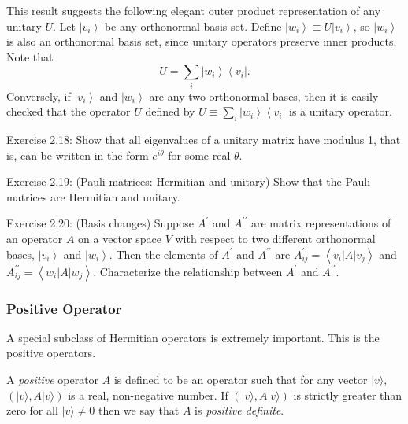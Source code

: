 This result suggests the following elegant outer product representation of any unitary $U$. Let $\left|v_{i}\right\rangle$ be any orthonormal basis set. Define $\left|w_{i}\right\rangle \equiv U\left|v_{i}\right\rangle$, so $\left|w_{i}\right\rangle$ is also an orthonormal basis set, since unitary operators preserve inner products. Note that
\begin{equation}
    U=\sum_{i}\left|w_{i}\right\rangle\left\langle v_{i}\right|.
\end{equation}
Conversely, if $\left|v_{i}\right\rangle$ and $\left|w_{i}\right\rangle$ are any two orthonormal bases, then it is easily checked that the operator $U$ defined by $U \equiv \sum_{i}\left|w_{i}\right\rangle\left\langle v_{i}\right|$ is a unitary operator.

\begin{exercise}
    Exercise 2.18: Show that all eigenvalues of a unitary matrix have modulus 1, that is, can be written in the form $e^{i \theta}$ for some real $\theta$.
\end{exercise}

\begin{exercise}
    Exercise 2.19: (Pauli matrices: Hermitian and unitary) Show that the Pauli matrices are Hermitian and unitary.
\end{exercise}

\begin{exercise}
    Exercise 2.20: (Basis changes) Suppose $A^{\prime}$ and $A^{\prime \prime}$ are matrix representations of an operator $A$ on a vector space $V$ with respect to two different orthonormal bases, $\left|v_{i}\right\rangle$ and $\left|w_{i}\right\rangle$. Then the elements of $A^{\prime}$ and $A^{\prime \prime}$ are $A_{i j}^{\prime}=\left\langle v_{i}|A| v_{j}\right\rangle$ and $A_{i j}^{\prime \prime}=\left\langle w_{i}|A| w_{j}\right\rangle$. Characterize the relationship between $A^{\prime}$ and $A^{\prime \prime}$.
\end{exercise}

\subsubsection{Positive Operator}

A special subclass of Hermitian operators is extremely important. This is the positive operators. 

A \textit{positive} operator $A$ is defined to be an operator such that for any vector $|v\rangle$, $(|v\rangle, A|v\rangle)$ is a real, non-negative number. If $(|v\rangle, A|v\rangle)$ is strictly greater than zero for all $|v\rangle \neq 0$ then we say that $A$ is \textit{positive definite}. 

